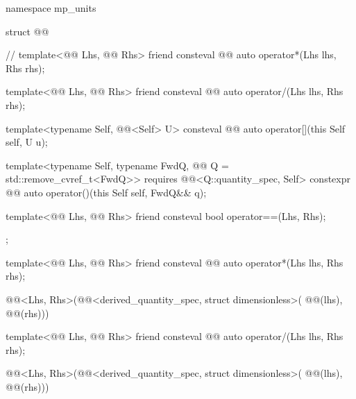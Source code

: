 \begin{codeblock}
namespace mp_units {

struct @@ {  // \expos
  template<@@ Lhs, @@ Rhs>
  friend consteval @@ auto operator*(Lhs lhs, Rhs rhs);

  template<@@ Lhs, @@ Rhs>
  friend consteval @@ auto operator/(Lhs lhs, Rhs rhs);

  template<typename Self, @@<Self{}> U>
  consteval @@ auto operator[](this Self self, U u);

  template<typename Self, typename FwdQ, @@ Q = std::remove_cvref_t<FwdQ>>
    requires @@<Q::quantity_spec, Self{}>
  constexpr @@ auto operator()(this Self self, FwdQ&& q);

  template<@@ Lhs, @@ Rhs>
  friend consteval bool operator==(Lhs, Rhs);
};

}
\end{codeblock}

\begin{itemdecl}
template<@@ Lhs, @@ Rhs>
friend consteval @@ auto operator*(Lhs lhs, Rhs rhs);
\end{itemdecl}

\begin{itemdescr}
\pnum
\returns
\begin{codeblock}
@@<Lhs{}, Rhs{}>(@@<derived_quantity_spec, struct dimensionless>(
  @@(lhs), @@(rhs)))
\end{codeblock}
\end{itemdescr}

\begin{itemdecl}
template<@@ Lhs, @@ Rhs>
friend consteval @@ auto operator/(Lhs lhs, Rhs rhs);
\end{itemdecl}

\begin{itemdescr}
\pnum
\returns
\begin{codeblock}
@@<Lhs{}, Rhs{}>(@@<derived_quantity_spec, struct dimensionless>(
  @@(lhs), @@(rhs)))
\end{codeblock}
\end{itemdescr}

